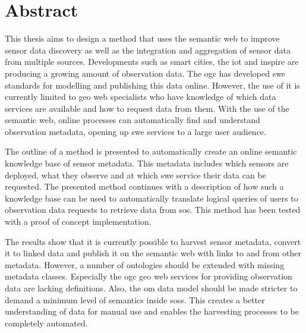 
\chapter*{Abstract}


This thesis aims to design a method that uses the semantic web to improve sensor data discovery as well as the integration and aggregation of sensor data from multiple sources. Developments such as smart cities, the \acf*{iot} and \ac*{inspire} are producing a growing amount of observation data. The \ac*{ogc} has developed \ac*{swe} standards for modelling and publishing this data online. However, the use of it is currently limited to geo web specialists who have knowledge of which data services are available and how to request data from them. With the use of the semantic web, online processes can automatically find and understand observation metadata, opening up \acs*{swe} services to a large user audience. 

The outline of a method is presented to automatically create an online semantic knowledge base of sensor metadata. This metadata includes which sensors are deployed, what they observe and at which \acs*{swe} service their data can be requested. The presented method continues with a description of how such a knowledge base can be used to automatically translate logical queries of users to observation data requests to retrieve data from \acf*{sos}. This method has been tested with a proof of concept implementation.

The results show that it is currently possible to harvest sensor metadata, convert it to linked data and publish it on the semantic web with links to and from other metadata. However, a number of ontologies should be extended with missing metadata classes. Especially the \acs*{ogc} geo web services for providing observation data are lacking definitions. Also, the \ac*{om} data model should be made stricter to demand a minimum level of semantics inside \aclp*{sos}. This creates a better understanding of data for manual use and enables the harvesting processes to be completely automated.    

